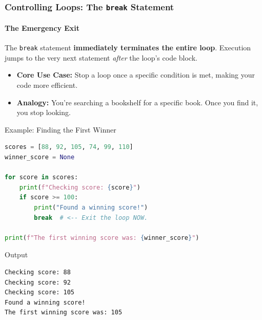 \documentclass{beamer}
\begin{document}
\begin{frame}[fragile]
    \frametitle{Controlling Loops: The \texttt{break} Statement}
    \framesubtitle{The Emergency Exit}
    
    The \texttt{break} statement \textbf{immediately terminates the entire loop}. Execution jumps to the very next statement \textit{after} the loop's code block.
    
    \begin{itemize}
        \item \textbf{Core Use Case:} Stop a loop once a specific condition is met, making your code more efficient.
        \item \textbf{Analogy:} You're searching a bookshelf for a specific book. Once you find it, you stop looking.
    \end{itemize}
    
    \begin{block}{Example: Finding the First Winner}
        \begin{lstlisting}[language=Python]
scores = [88, 92, 105, 74, 99, 110]
winner_score = None

for score in scores:
    print(f"Checking score: {score}")
    if score >= 100:
        print("Found a winning score!")
        break  # <-- Exit the loop NOW.
        
print(f"The first winning score was: {winner_score}")
        \end{lstlisting}
    \end{block}
    
    \begin{block}{Output}
        \begin{verbatim}
Checking score: 88
Checking score: 92
Checking score: 105
Found a winning score!
The first winning score was: 105
        \end{verbatim}
    \end{block}
    
\end{frame}
\end{document}
